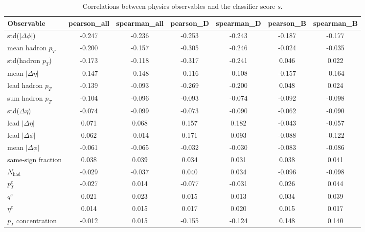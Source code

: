 \begin{table}
\caption{Correlations between physics observables and the classifier score $s$.}
\label{tab:corr_full}
\begin{tabular}{lcccccc}
\toprule
Observable & pearson_all & spearman_all & pearson_D & spearman_D & pearson_B & spearman_B \\
\midrule
std($|\Delta\phi|$) & -0.247 & -0.236 & -0.253 & -0.243 & -0.187 & -0.177 \\
mean hadron $p_T$ & -0.200 & -0.157 & -0.305 & -0.246 & -0.024 & -0.035 \\
std(hadron $p_T$) & -0.173 & -0.118 & -0.317 & -0.241 & 0.046 & 0.022 \\
mean $|\Delta\eta|$ & -0.147 & -0.148 & -0.116 & -0.108 & -0.157 & -0.164 \\
lead hadron $p_T$ & -0.139 & -0.093 & -0.269 & -0.200 & 0.048 & 0.024 \\
sum hadron $p_T$ & -0.104 & -0.096 & -0.093 & -0.074 & -0.092 & -0.098 \\
std($\Delta\eta$) & -0.074 & -0.099 & -0.073 & -0.090 & -0.062 & -0.090 \\
lead $|\Delta\eta|$ & 0.071 & 0.068 & 0.157 & 0.182 & -0.043 & -0.057 \\
lead $|\Delta\phi|$ & 0.062 & -0.014 & 0.171 & 0.093 & -0.088 & -0.122 \\
mean $|\Delta\phi|$ & -0.061 & -0.065 & -0.032 & -0.030 & -0.083 & -0.086 \\
same-sign fraction & 0.038 & 0.039 & 0.034 & 0.031 & 0.038 & 0.041 \\
$N_{\mathrm{had}}$ & -0.029 & -0.037 & 0.040 & 0.034 & -0.096 & -0.098 \\
$p_T^e$ & -0.027 & 0.014 & -0.077 & -0.031 & 0.026 & 0.044 \\
$q^e$ & 0.021 & 0.023 & 0.015 & 0.013 & 0.034 & 0.039 \\
$\eta^e$ & 0.014 & 0.015 & 0.017 & 0.020 & 0.015 & 0.017 \\
$p_T$ concentration & -0.012 & 0.015 & -0.155 & -0.124 & 0.148 & 0.140 \\
\bottomrule
\end{tabular}
\end{table}
